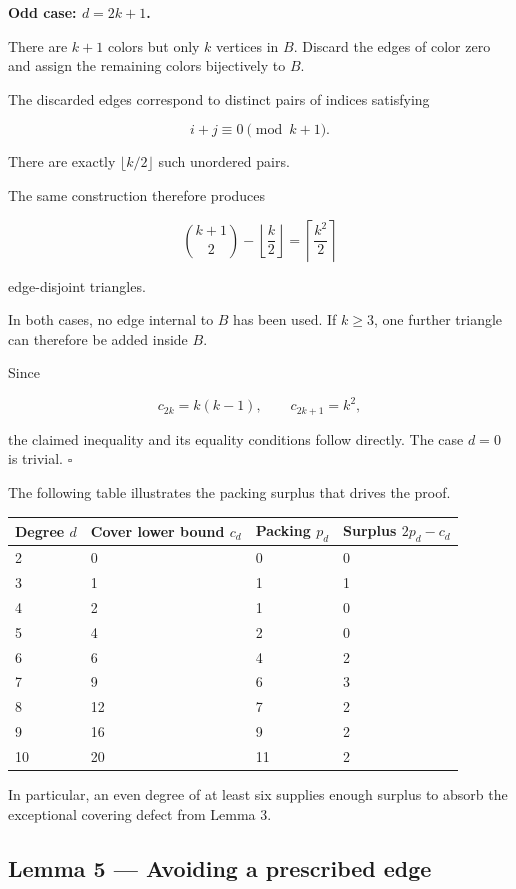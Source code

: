 \documentclass[11pt]{article}
\begin{document}
\textbf{Odd case: \(d=2k+1\).}

There are \(k+1\) colors but only \(k\) vertices in \(B\). Discard the edges of color zero and assign the remaining colors bijectively to \(B\).

The discarded edges correspond to distinct pairs of indices satisfying

\[
i+j\equiv0\pmod{k+1}.
\]

There are exactly \(\lfloor k/2\rfloor\) such unordered pairs.

The same construction therefore produces

\[
\binom{k+1}{2}-\left\lfloor\frac k2\right\rfloor
=\left\lceil\frac{k^2}{2}\right\rceil
\]

edge-disjoint triangles.

In both cases, no edge internal to \(B\) has been used. If \(k\geq3\), one further triangle can therefore be added inside \(B\).

Since

\[
c_{2k}=k(k-1),\qquad c_{2k+1}=k^2,
\]

the claimed inequality and its equality conditions follow directly. The case \(d=0\) is trivial. \(\square\)

The following table illustrates the packing surplus that drives the proof.

\begin{center}
\small
\begin{tabular}{llll}
Degree \(d\) & Cover lower bound \(c_d\) & Packing \(p_d\) & Surplus \(2p_d-c_d\) \\
\hline
2 & 0 & 0 & 0 \\
3 & 1 & 1 & 1 \\
4 & 2 & 1 & 0 \\
5 & 4 & 2 & 0 \\
6 & 6 & 4 & 2 \\
7 & 9 & 6 & 3 \\
8 & 12 & 7 & 2 \\
9 & 16 & 9 & 2 \\
10 & 20 & 11 & 2 \\
\end{tabular}
\end{center}

In particular, an even degree of at least six supplies enough surplus to absorb the exceptional covering defect from Lemma 3.

\subsection{Lemma 5 --- Avoiding a prescribed edge}
\end{document}
